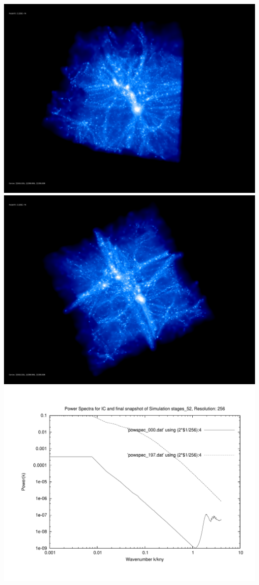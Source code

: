 \includegraphics[scale=0.1]{r256/h100/stages_52/rotate_00074.jpg} 
\includegraphics[scale=0.1]{r256/h100/stages_52/rotate_00131.jpg}  \\

\includegraphics[scale=0.5]{r256/h100/stages_52/plot_powspec_stages_52}


